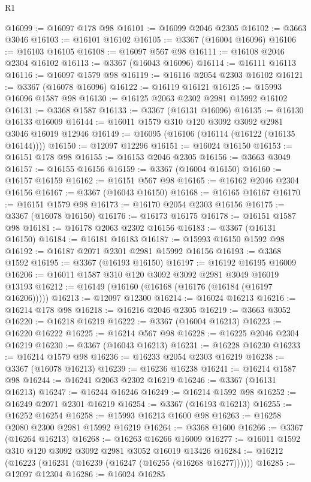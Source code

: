 \begin{lexlean}{R1}
\begin{coremodule}
@16099 := @16097 @178 @98
@16101 := @16099 @2046 @2305
@16102 := @3663 @3046
@16103 := @16101 @16102
@16105 := @3367 (@16004 @16096)
@16106 := @16103 @16105
@16108 := @16097 @567 @98
@16111 := @16108 @2046 @2304 @16102
@16113 := @3367 (@16043 @16096)
@16114 := @16111 @16113
@16116 := @16097 @1579 @98
@16119 := @16116 @2054 @2303 @16102
@16121 := @3367 (@16078 @16096)
@16122 := @16119 @16121
@16125 := @15993 @16096 @1587 @98
@16130 := @16125 @2063 @2302 @2981 @15992 @16102
@16131 := @3368 @1587
@16133 := @3367 (@16131 @16096)
@16135 := @16130 @16133 @16009
@16144 := @16011 @1579 @310 @120 @3092 @3092 @2981 @3046 @16019 @12946
@16149 := @16095 (@16106 (@16114 (@16122 (@16135 @16144))))
@16150 := @12097 @12296
@16151 := @16024 @16150
@16153 := @16151 @178 @98
@16155 := @16153 @2046 @2305
@16156 := @3663 @3049
@16157 := @16155 @16156
@16159 := @3367 (@16004 @16150)
@16160 := @16157 @16159
@16162 := @16151 @567 @98
@16165 := @16162 @2046 @2304 @16156
@16167 := @3367 (@16043 @16150)
@16168 := @16165 @16167
@16170 := @16151 @1579 @98
@16173 := @16170 @2054 @2303 @16156
@16175 := @3367 (@16078 @16150)
@16176 := @16173 @16175
@16178 := @16151 @1587 @98
@16181 := @16178 @2063 @2302 @16156
@16183 := @3367 (@16131 @16150)
@16184 := @16181 @16183
@16187 := @15993 @16150 @1592 @98
@16192 := @16187 @2071 @2301 @2981 @15992 @16156
@16193 := @3368 @1592
@16195 := @3367 (@16193 @16150)
@16197 := @16192 @16195 @16009
@16206 := @16011 @1587 @310 @120 @3092 @3092 @2981 @3049 @16019 @13193
@16212 := @16149 (@16160 (@16168 (@16176 (@16184 (@16197 @16206)))))
@16213 := @12097 @12300
@16214 := @16024 @16213
@16216 := @16214 @178 @98
@16218 := @16216 @2046 @2305
@16219 := @3663 @3052
@16220 := @16218 @16219
@16222 := @3367 (@16004 @16213)
@16223 := @16220 @16222
@16225 := @16214 @567 @98
@16228 := @16225 @2046 @2304 @16219
@16230 := @3367 (@16043 @16213)
@16231 := @16228 @16230
@16233 := @16214 @1579 @98
@16236 := @16233 @2054 @2303 @16219
@16238 := @3367 (@16078 @16213)
@16239 := @16236 @16238
@16241 := @16214 @1587 @98
@16244 := @16241 @2063 @2302 @16219
@16246 := @3367 (@16131 @16213)
@16247 := @16244 @16246
@16249 := @16214 @1592 @98
@16252 := @16249 @2071 @2301 @16219
@16254 := @3367 (@16193 @16213)
@16255 := @16252 @16254
@16258 := @15993 @16213 @1600 @98
@16263 := @16258 @2080 @2300 @2981 @15992 @16219
@16264 := @3368 @1600
@16266 := @3367 (@16264 @16213)
@16268 := @16263 @16266 @16009
@16277 := @16011 @1592 @310 @120 @3092 @3092 @2981 @3052 @16019 @13426
@16284 := @16212 (@16223 (@16231 (@16239 (@16247 (@16255 (@16268 @16277))))))
@16285 := @12097 @12304
@16286 := @16024 @16285

\end{coremodule}
\end{lexlean}
